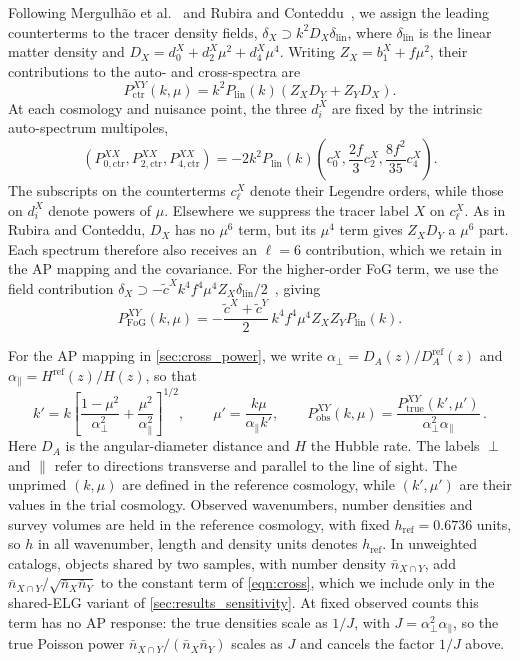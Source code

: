 \documentclass[a4paper,11pt]{article}
\newcommand{\revchange}[1]{{\color{RevisionColor}#1}}
\newcommand{\ctilde}{\tilde{c}}
\newcommand{\nbar}{\bar{n}}
\begin{document}
\revchange{Following Mergulh\~ao et al.~\cite{Mergulhao:2023zso}
and Rubira and Conteddu~\cite{Rubira:2025scu}, we assign the leading
counterterms to the tracer density fields,
$\delta_X\supset k^2D_X\delta_{\mathrm{lin}}$, where $\delta_{\mathrm{lin}}$ is the linear
matter density and $D_X=d_0^X+d_2^X\mu^2+d_4^X\mu^4$. Writing $Z_X=b_1^X+f\mu^2$,
their contributions to the auto- and cross-spectra are
\[
P_{\mathrm{ctr}}^{XY}(k,\mu)=k^2P_{\mathrm{lin}}(k)
\left(Z_XD_Y+Z_YD_X\right).
\]
At each cosmology and nuisance point, the three $d_i^X$ are fixed by
the intrinsic auto-spectrum multipoles,
\[
\left(P_{0,\mathrm{ctr}}^{XX},P_{2,\mathrm{ctr}}^{XX},P_{4,\mathrm{ctr}}^{XX}\right)
=-2k^2P_{\mathrm{lin}}(k)
\left(c_0^X,\frac{2f}{3}c_2^X,\frac{8f^2}{35}c_4^X\right).
\]
The subscripts on the counterterms $c_\ell^X$ denote their Legendre orders,
while those on $d_i^X$ denote powers of $\mu$.
Elsewhere we suppress the tracer label $X$ on $c_\ell^X$.
As in Rubira and Conteddu, $D_X$ has no $\mu^6$ term, but its $\mu^4$ term
gives $Z_XD_Y$ a $\mu^6$ part. Each spectrum therefore also receives an
$\ell=6$ contribution, which we retain in the AP mapping and the covariance.
For the higher-order FoG term, we use the field contribution
$\delta_X\supset-\ctilde^Xk^4f^4\mu^4Z_X\delta_{\mathrm{lin}}/2$~\cite{Ivanov:2024xgb},
giving
\[
P_{\mathrm{FoG}}^{XY}(k,\mu)=-\frac{\ctilde^X+\ctilde^Y}{2}\,
k^4f^4\mu^4Z_XZ_YP_{\mathrm{lin}}(k).
\]}

\revchange{For the AP mapping in \cref{sec:cross_power}, we write
$\alpha_\perp=D_A(z)/D_A^{\mathrm{ref}}(z)$ and
$\alpha_\parallel=H^{\mathrm{ref}}(z)/H(z)$, so that
\[
k'=k\left[\frac{1-\mu^2}{\alpha_\perp^2}
          +\frac{\mu^2}{\alpha_\parallel^2}\right]^{1/2},
\qquad
\mu'=\frac{k\mu}{\alpha_\parallel k'},
\qquad
P_{\mathrm{obs}}^{XY}(k,\mu)=
\frac{P_{\mathrm{true}}^{XY}(k',\mu')}
     {\alpha_\perp^2\alpha_\parallel}\,.
\]
Here $D_A$ is the angular-diameter distance and $H$ the Hubble rate.
The labels $\perp$ and $\parallel$ refer to directions transverse
and parallel to the line of sight. The unprimed $(k,\mu)$ are defined
in the reference cosmology, while $(k',\mu')$ are their values in the
trial cosmology.
Observed wavenumbers, number densities and survey volumes
are held in the reference cosmology, with fixed $h_{\mathrm{ref}}=0.6736$
units, so $h$ in all wavenumber, length and density units denotes $h_{\mathrm{ref}}$. In unweighted catalogs, objects shared by two samples, with number density
$\nbar_{X\cap Y}$, add $\nbar_{X\cap Y}/\sqrt{\nbar_X\nbar_Y}$ to the constant term of
\cref{eqn:cross}, which we include only in the shared-ELG variant of
\cref{sec:results_sensitivity}. At fixed observed counts this term has no AP
response: the true densities scale as $1/J$, with $J=\alpha_\perp^2\alpha_\parallel$, so the
true Poisson power $\nbar_{X\cap Y}/(\nbar_X\nbar_Y)$ scales as $J$ and cancels the
factor $1/J$ above.}
\end{document}
